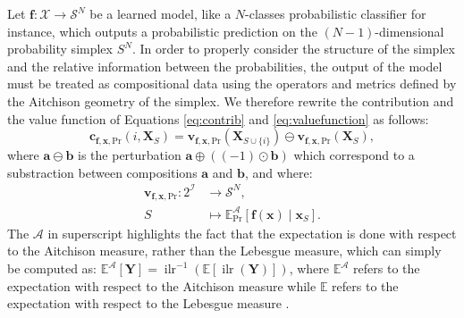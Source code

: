 \documentclass{article}
\theoremstyle{plain}
\theoremstyle{definition}
\theoremstyle{remark}
\DeclareMathOperator{\ilr}{ilr}
\begin{document}
Let $\bm{f}:\mathcal{X}\to\mathcal{S}^N$ be a learned model, like a $N$-classes probabilistic classifier for instance, which outputs a probabilistic prediction on the $(N-1)$-dimensional probability simplex $S^N$. In order to properly consider the structure of the simplex and the relative information between the probabilities, the output of the model must be treated as compositional data using the operators and metrics defined by the Aitchison geometry of the simplex. We therefore rewrite the contribution and the value function of Equations \ref{eq:contrib} and \ref{eq:valuefunction} as follows:
\begin{equation}
  \bm{c}_{\bm{f},\bm{x},\text{Pr}}(i,\bm{X}_S) = \bm{v}_{\bm{f},\bm{x},\text{Pr}}(\bm{X}_{S\cup\{i\}}) \ominus \bm{v}_{\bm{f},\bm{x},\text{Pr}}(\bm{X}_S),
\end{equation}
where $\bm{a}\ominus\bm{b}$ is the perturbation $\bm{a} \oplus \left( (-1)\odot \bm{b}\right)$ which correspond to a substraction between compositions $\bm{a}$ and $\bm{b}$, and where:
\begin{equation}
  \label{eq:valuefunctionsimplex}
  \begin{aligned}
    \bm{v}_{\bm{f},\bm{x},\text{Pr}}: 2^{\mathcal{I}} &\to \mathcal{S}^N,\\
    S &\mapsto \mathbb{E}^{\mathcal{A}}_\text{Pr}[\bm{f}(\bm{x})\mid \bm{x}_S].
  \end{aligned}
\end{equation}
The $\mathcal{A}$ in superscript highlights the fact that the expectation is done with respect to the Aitchison measure, rather than the Lebesgue measure, which can simply be computed as: $\mathbb{E}^{\mathcal{A}}[\bm{Y}] = \ilr^{-1}\left( \mathbb{E} \left[ \ilr\left( \bm{Y} \right) \right] \right)$,
where $\mathbb{E}^{\mathcal{A}}$ refers to the expectation with respect to the Aitchison measure while $\mathbb{E}$ refers to the expectation with respect to the Lebesgue measure \cite{pawlowskymodeling}.
\end{document}
